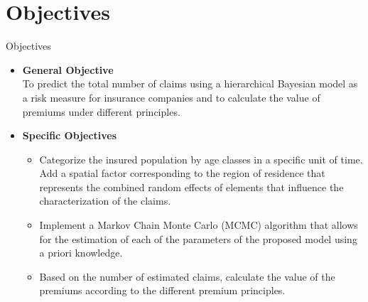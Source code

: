 \documentclass[10pt]{beamer} %
\begin{document}
\section{Objectives}
\begin{frame}{Objectives}
\begin{itemize}
    \item \textbf{General Objective}\\
    To predict the total number of claims using a hierarchical Bayesian model as a risk measure for insurance companies and to calculate the value of premiums under different principles.\\
    \item\textbf{Specific Objectives}
    \begin{itemize}
        \item Categorize the insured population by age classes in a specific unit of time. Add a spatial factor corresponding to the region of residence that represents the combined random effects of elements that influence the characterization of the claims.
	\item Implement a Markov Chain Monte Carlo (MCMC) algorithm that allows for the estimation of each of the parameters of the proposed model using a priori knowledge.
	\item Based on the number of estimated claims, calculate the value of the premiums according to the different premium principles. 
    \end{itemize}
\end{itemize}
\end{frame}
\end{document}
